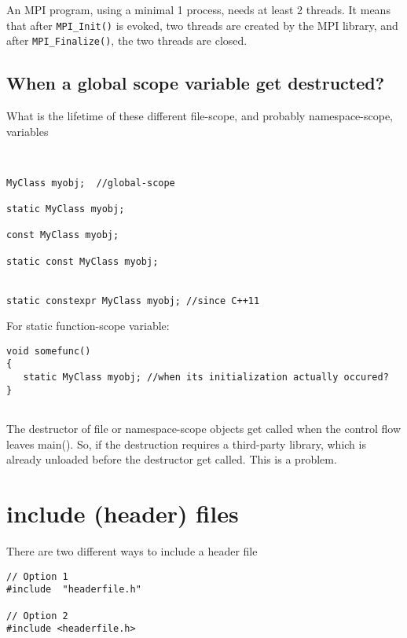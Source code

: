 An MPI program, using a minimal 1 process, needs at least 2 threads. It means
that after \verb!MPI_Init()! is evoked, two threads are created by the MPI
library, and after \verb!MPI_Finalize()!, the two threads are closed.

\subsection{When a global scope variable get destructed?}

What is the lifetime of these different file-scope, and probably namespace-scope, variables
\begin{lstlisting}


MyClass myobj;  //global-scope

static MyClass myobj; 

const MyClass myobj;

static const MyClass myobj;


static constexpr MyClass myobj; //since C++11
\end{lstlisting}


For static function-scope variable:
\begin{lstlisting}
void somefunc()
{
   static MyClass myobj; //when its initialization actually occured?
}


\end{lstlisting}


The destructor of file or namespace-scope objects get called when the control
flow leaves main(). So, if the destruction requires a third-party library, which
is already unloaded before the destructor get called. This is a problem.


\section{include (header) files}
\label{sec:include-files}

There are two different ways to include a header file
\begin{verbatim}
// Option 1
#include  "headerfile.h"

// Option 2 
#include <headerfile.h>
\end{verbatim}

